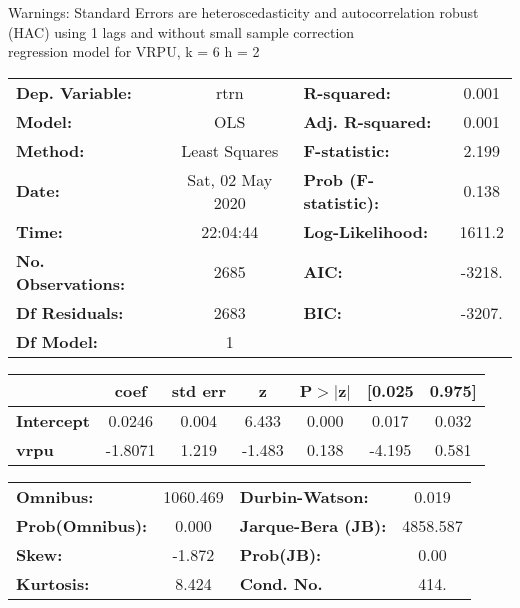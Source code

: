 Warnings: \newline
 [1] Standard Errors are heteroscedasticity and autocorrelation robust (HAC) using 1 lags and without small sample correction\\ 

regression model for VRPU, k = 6 h = 2\begin{center}
\begin{tabular}{lclc}
\toprule
\textbf{Dep. Variable:}    &       rtrn       & \textbf{  R-squared:         } &     0.001   \\
\textbf{Model:}            &       OLS        & \textbf{  Adj. R-squared:    } &     0.001   \\
\textbf{Method:}           &  Least Squares   & \textbf{  F-statistic:       } &     2.199   \\
\textbf{Date:}             & Sat, 02 May 2020 & \textbf{  Prob (F-statistic):} &    0.138    \\
\textbf{Time:}             &     22:04:44     & \textbf{  Log-Likelihood:    } &    1611.2   \\
\textbf{No. Observations:} &        2685      & \textbf{  AIC:               } &    -3218.   \\
\textbf{Df Residuals:}     &        2683      & \textbf{  BIC:               } &    -3207.   \\
\textbf{Df Model:}         &           1      & \textbf{                     } &             \\
\bottomrule
\end{tabular}
\begin{tabular}{lcccccc}
                   & \textbf{coef} & \textbf{std err} & \textbf{z} & \textbf{P$> |$z$|$} & \textbf{[0.025} & \textbf{0.975]}  \\
\midrule
\textbf{Intercept} &       0.0246  &        0.004     &     6.433  &         0.000        &        0.017    &        0.032     \\
\textbf{vrpu}      &      -1.8071  &        1.219     &    -1.483  &         0.138        &       -4.195    &        0.581     \\
\bottomrule
\end{tabular}
\begin{tabular}{lclc}
\textbf{Omnibus:}       & 1060.469 & \textbf{  Durbin-Watson:     } &    0.019  \\
\textbf{Prob(Omnibus):} &   0.000  & \textbf{  Jarque-Bera (JB):  } & 4858.587  \\
\textbf{Skew:}          &  -1.872  & \textbf{  Prob(JB):          } &     0.00  \\
\textbf{Kurtosis:}      &   8.424  & \textbf{  Cond. No.          } &     414.  \\
\bottomrule
\end{tabular}
\end{center}

